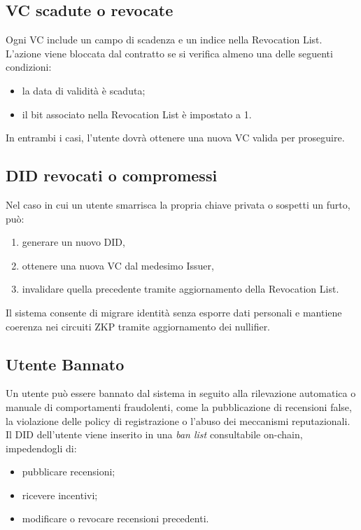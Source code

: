         \subsection{VC scadute o revocate}
            Ogni VC include un campo di scadenza e un indice nella Revocation List.
            L'azione viene bloccata dal contratto se si verifica almeno una delle seguenti condizioni:
                \begin{itemize}
                    \item la data di validità è scaduta;
                    
                    \item il bit associato nella Revocation List è impostato a 1.
                \end{itemize}
            
            \noindent In entrambi i casi, l'utente dovrà ottenere una nuova VC valida per proseguire.
    
        \subsection{DID revocati o compromessi}
            Nel caso in cui un utente smarrisca la propria chiave privata o sospetti un furto, può:
                \begin{enumerate}
                    \item generare un nuovo DID,
                    
                    \item ottenere una nuova VC dal medesimo Issuer,
                    
                    \item invalidare quella precedente tramite aggiornamento della Revocation List.
                \end{enumerate}
    
            \noindent Il sistema consente di migrare identità senza esporre dati personali e mantiene coerenza nei circuiti ZKP tramite aggiornamento dei nullifier.

        \subsection{Utente Bannato}
            Un utente può essere bannato dal sistema in seguito alla rilevazione automatica o manuale di comportamenti fraudolenti, come la pubblicazione di recensioni false, la violazione delle policy di registrazione o l'abuso dei meccanismi reputazionali.
            Il DID dell'utente viene inserito in una \textit{ban list} consultabile on-chain, impedendogli di:
                \begin{itemize}
                    \item pubblicare recensioni;
                    
                    \item ricevere incentivi;
                    
                    \item modificare o revocare recensioni precedenti.
                \end{itemize}
                
